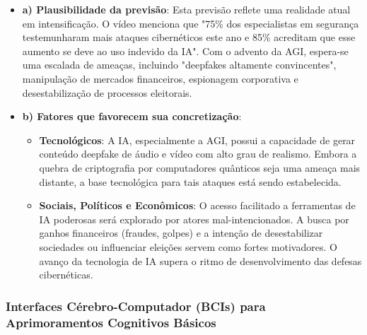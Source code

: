 \documentclass[a4paper,12pt]{article}
\begin{document}
\begin{itemize}
\item \textbf{a) Plausibilidade da previsão}: Esta previsão reflete uma realidade atual em intensificação. O vídeo menciona que "75\% dos especialistas em segurança testemunharam mais ataques cibernéticos este ano e 85\% acreditam que esse aumento se deve ao uso indevido da IA". Com o advento da AGI, espera-se uma escalada de ameaças, incluindo "deepfakes altamente convincentes", manipulação de mercados financeiros, espionagem corporativa e desestabilização de processos eleitorais.

\item \textbf{b) Fatores que favorecem sua concretização}:
  \begin{itemize}
  \item \textbf{Tecnológicos}: A IA, especialmente a AGI, possui a capacidade de gerar conteúdo deepfake de áudio e vídeo com alto grau de realismo. Embora a quebra de criptografia por computadores quânticos seja uma ameaça mais distante, a base tecnológica para tais ataques está sendo estabelecida.
  \item \textbf{Sociais, Políticos e Econômicos}: O acesso facilitado a ferramentas de IA poderosas será explorado por atores mal-intencionados. A busca por ganhos financeiros (fraudes, golpes) e a intenção de desestabilizar sociedades ou influenciar eleições servem como fortes motivadores. O avanço da tecnologia de IA supera o ritmo de desenvolvimento das defesas cibernéticas.
  \end{itemize}
\end{itemize}

\subsubsection{Interfaces Cérebro-Computador (BCIs) para Aprimoramentos Cognitivos Básicos}
\end{document}
